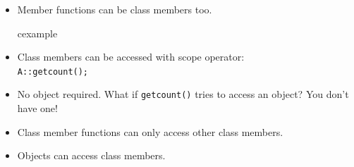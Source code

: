 \begin{frame}
\begin{itemize}
\item Member functions can be class members too.
\begin{beamercolorbox}{cexample}
\codeclassmemthree
\end{beamercolorbox}
\item Class members can be accessed with scope operator:\\
	\lstinline!A::getcount();!
\item No object required. What if \lstinline!getcount()! tries to
	access an object? You don't have one!
\item Class member functions can only access other class members.
\item Objects can access class members.
\end{itemize}
\end{frame}



